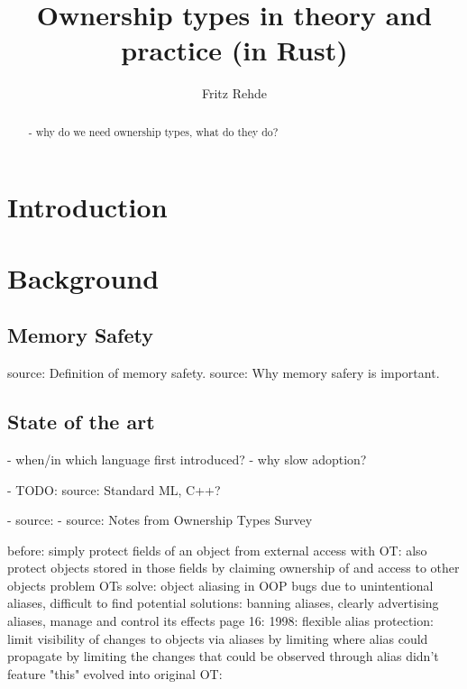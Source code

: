 \documentclass[sigplan,11pt,nonacm]{acmart}
\begin{document}
\title{Ownership types in theory and practice (in Rust)}
\author{Fritz Rehde}

\begin{abstract}

- why do we need ownership types, what do they do?

\end{abstract}


\maketitle

\section{Introduction}
\label{sec:introduction}


\section{Background}
\label{sec:background}

\subsection{Memory Safety}

source: Definition of memory safety\cite{memory1}.
source: Why memory safery is important\cite{nsa-memory-safety}.


\subsection{State of the art}

- when/in which language first introduced?
- why slow adoption?

 - TODO: source: Standard ML, C++?

- source: \cite{understanding-evolving-rust}
- source: \cite{ownership-types-survey}
Notes from Ownership Types Survey\cite{ownership-types-survey}

before: simply protect fields of an object from external access
with OT: also protect objects stored in those fields by claiming ownership of and access to other objects
problem OTs solve: object aliasing in OOP
bugs due to unintentional aliases, difficult to find
potential solutions: banning aliases, clearly advertising aliases, manage and control its effects
page 16:
1998: flexible alias protection:
limit visibility of changes to objects via aliases
by limiting where alias could propagate
by limiting the changes that could be observed through alias
didn't feature "this"
evolved into original OT:
\end{document}
